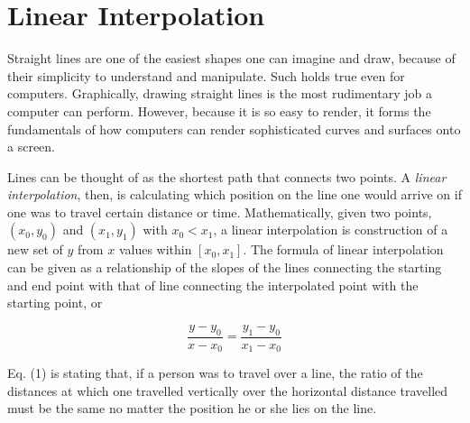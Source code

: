 \documentclass[11pt, oneside]{article}   	%
\theoremstyle{definition}
\numberwithin{figure}{section}
\begin{document}

\section{Linear Interpolation}

Straight lines are one of the easiest shapes one can imagine and draw, because of their simplicity to understand and manipulate. Such holds true even for computers. Graphically, drawing straight lines is the most rudimentary job a computer can perform. However, because it is so easy to render, it forms the fundamentals of how computers can render sophisticated curves and surfaces onto a screen.

Lines can be thought of as the shortest path that connects two points. A {\em linear interpolation}, then, is calculating which position on the line one would arrive on if one was to travel certain distance or time. Mathematically, given two points, \((x_0, y_0)\) and \((x_1,y_1)\) with \(x_0 < x_1\), a linear interpolation is construction of a new set of \(y\) from \(x\) values within \([x_0, x_1]\). The formula of linear interpolation can be given as a relationship of the slopes of the lines connecting the starting and end point with that of line connecting the interpolated point with the starting point, or

\begin{equation}
\frac{y-y_0}{x-x_0}=\frac{y_1-y_0}{x_1-x_0}
\end{equation}

Eq. (1) is stating that, if a person was to travel over a line, the ratio of the distances at which one travelled vertically over the horizontal distance travelled must be the same no matter the position he or she lies on the line.
\end{document}
